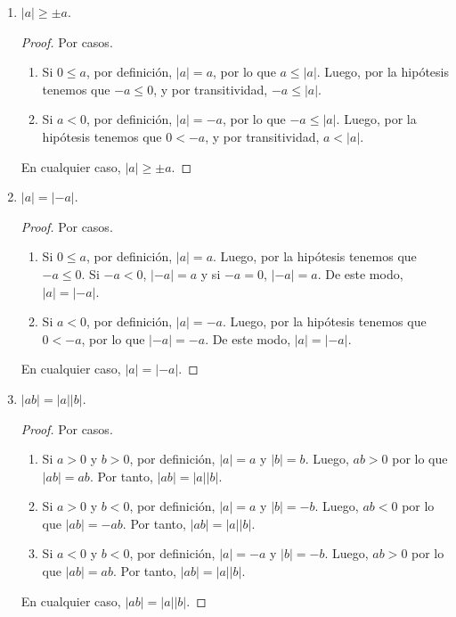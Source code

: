 \documentclass[11pt]{article}
\begin{document}
\begin{enumerate}[label=\alph*)]
\item $|a| \geq \pm a$.

\vspace{-1em}\begin{proof}
    Por casos.
    \begin{enumerate}[label=\roman*)]
        \item Si $0 \leq a$, por definición, $|a|=a$, por lo que $a\leq |a|$. Luego, por la hipótesis tenemos que $-a \leq 0$, y por transitividad, $-a\leq |a|$.
        \item Si $a<0$, por definición, $|a|=-a$, por lo que $-a\leq |a|$. Luego, por la hipótesis tenemos que $0<-a$, y por transitividad, $a<|a|$.
    \end{enumerate}
    En cualquier caso, $|a| \geq \pm a$.
\end{proof} \vspace{-1em}    

\item $|a|=|-a|$.
\vspace{-1em}\begin{proof}
    Por casos.
    \begin{enumerate}[label=\roman*)]
        \item Si $0 \leq a$, por definición, $|a|=a$. Luego, por la hipótesis tenemos que $-a \leq 0$. Si $-a<0$, $|-a|=a$ y si $-a=0$, $|-a|=a$. De este modo, $|a|=|-a|$.
        \item Si $a<0$, por definición, $|a|=-a$. Luego, por la hipótesis tenemos que $0<-a$, por lo que $|-a|=-a$. De este modo, $|a|=|-a|$.
    \end{enumerate}
    En cualquier caso, $|a|=|-a|$.
\end{proof} \vspace{-1em}

\item $|ab|=|a||b|$.

\vspace{-1em}\begin{proof}
    Por casos.
    \begin{enumerate}[label=\roman*)]
        \item Si $a>0$ y $b>0$, por definición, $|a|=a$ y $|b|=b$. Luego, $ab>0$ por lo que $|ab|=ab$. Por tanto, $|ab| =|a||b|$.
        \item Si $a>0$ y $b<0$, por definición, $|a|=a$ y $|b|=-b$. Luego, $ab<0$ por lo que $|ab|=-ab$. Por tanto, $|  ab|=|a||b|$.
        \item Si $a<0$ y $b<0$, por definición, $|a|=-a$ y $|b|=-b$. Luego, $ab>0$ por lo que $|ab|=ab$. Por tanto, $|  ab|=|a||b|$.
    \end{enumerate}
    En cualquier caso, $|ab|=|a||b|$.
\end{proof} \vspace{-1em}


\end{enumerate}
\end{document}
